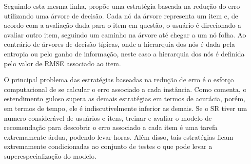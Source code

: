 Seguindo esta mesma linha, \citep{Golbandi:2011:ABR:1935826.1935910} propõe uma estratégia baseada na redução do erro utilizando uma árvore de decisão. Cada nó da árvore representa um item e, de acordo com a avaliação dada para o item em questão, o usuário é direcionado a avaliar outro item, seguindo um caminho na árvore até chegar a um nó folha. Ao contrário de árvores de decisão típicas, onde a hierarquia dos nós é dada pela entropia ou pelo ganho de informação, neste caso a hierarquia dos nós é definida pelo valor de RMSE associado ao item.

O principal problema das estratégias baseadas na redução de erro é o esforço computacional de se calcular o erro associado a cada instância. Como \citep{Golbandi:2010:BRS:1871437.1871734} comenta, o estendimento guloso supera as demais estratégias em termos de acurácia, porém, em termos de tempo, ele é indiscutivelmente inferior as demais. Se o SR tiver um numero considerável de usuários e itens, treinar e avaliar o modelo de recomendação para descobrir o erro associado a cada item é uma tarefa extremamente árdua, podendo levar horas. Além disso, tais estratégias ficam extremamente condicionadas ao conjunto de testes o que pode levar a superespecialização do modelo.